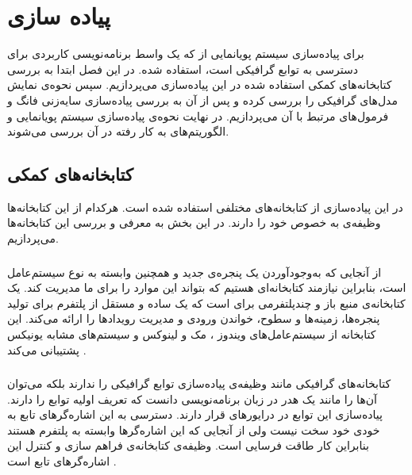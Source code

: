 \chapter { پیاده سازی }



برای پیاده‌سازی سیستم پویانمایی از 
که یک واسط برنامه‌نویسی کاربردی برای دسترسی به توابع گرافیکی است، استفاده شده.
در این فصل ابتدا به بررسی کتابخانه‌های کمکی استفاده شده در این پیاده‌سازی می‌پردازیم. سپس 
نحوه‌ی نمایش مدل‌های گرافیکی را بررسی کرده و پس از آن به بررسی پیاده‌سازی 
سایه‌زنی فانگ و فرمول‌های مرتبط با آن می‌پردازیم. در نهایت نحوه‌ی پیاده‌سازی سیستم پویانمایی و 
الگوریتم‌های به کار رفته در آن بررسی می‌‌شوند.

\section {کتابخانه‌‌های کمکی}

در این پیاده‌سازی از کتابخانه‌‌های مختلفی استفاده شده‌ است. هرکدام از این کتابخانه‌ها وظیفه‌ی 
به خصوص خود را دارند. در این بخش به معرفی و بررسی این کتابخانه‌ها می‌پردازیم.


\subsection{}

از آنجایی که به‌وجود‌آوردن یک پنجره‌ی جدید و همچنین 
وابسته به نوع سیستم‌عامل است، بنابراین نیازمند کتابخانه‌ای هستیم که بتواند این موارد را برای ما مدیریت کند.
یک کتابخانه‌ی منبع باز و چندپلتفرمی برای 
است که یک
ساده و مستقل از پلتفرم برای تولید پنجره‌ها، زمینه‌‌ها
و سطوح، خواندن ورودی و مدیریت رویداد‌ها
را ارائه می‌کند. 
این کتابخانه از سیستم‌عامل‌های 
ویندوز
، 
مک
و 
لینوکس
و سیستم‌های مشابه یونیکس پشتیبانی ‌می‌کند \cite{GLFW}.


\subsection{}
کتابخانه‌های گرافیکی مانند
وظیفه‌‌ی پیاده‌سازی توابع گرافیکی را ندارند بلکه می‌توان آن‌ها را مانند یک هدر در زبان 
برنامه‌نویسی 
دانست که تعریف اولیه توابع را دارند. پیاده‌سازی این توابع در درایور‌های 
قرار دارند.
دسترسی به این اشاره‌گر‌‌های تابع به خودی خود سخت نیست ولی از آنجایی که این اشاره‌گرها وابسته به پلتفرم هستند بنابراین کار طاقت فرسایی است. 
وظیفه‌ی کتابخانه‌ی 
فراهم سازی و کنترل این اشاره‌گرهای تابع است \cite{GLAD}.


